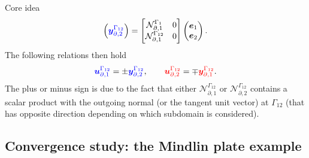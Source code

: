 \documentclass[aspectratio=169]{ISAE-Beamer}
\begin{document}
\begin{frame}{Core idea}
\begin{equation*}
\begin{pmatrix}
\textcolor{blue}{\bm{y}_{\partial, 2}^{\Gamma_{12}}}\\
\end{pmatrix} = \begin{bmatrix}
\mathcal{N}_{\partial, 1}^{\Gamma_1} & 0 \\
\mathcal{N}_{\partial, 1}^{\Gamma_{12}}  & 0 \\
\end{bmatrix} \begin{pmatrix}
\bm{e}_1 \\ \bm{e}_2
\end{pmatrix}.
\end{equation*}
The following relations then hold
\begin{equation*}
\textcolor{blue}{\bm{u}_{\partial, 1}^{\Gamma_{12}}} =\pm \textcolor{blue}{\bm{y}_{\partial, 2}^{\Gamma_{12}}}, \qquad \textcolor{red}{\bm{u}_{\partial, 2}^{\Gamma_{12}}} = \mp \textcolor{red}{\bm{y}_{\partial, 1}^{\Gamma_{12}}}.
\end{equation*}
The plus or minus sign is due to the fact that either $\mathcal{N}_{\partial, 1}^{\Gamma_{12}}$ or $\mathcal{N}_{\partial, 2}^{\Gamma_{12}}$ contains a scalar product with the outgoing normal (or the tangent unit vector) at ${\Gamma_{12}}$ (that has opposite direction depending on which subdomain is considered).
\end{frame}

\subsection{Convergence study: the Mindlin plate example}
\end{document}
